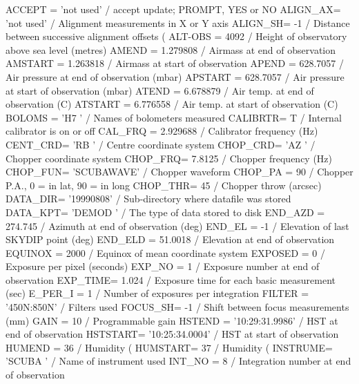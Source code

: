 \documentclass[twoside,11pt,nolof]{starlink}
\begin{document}
\begin{small}
\begin{terminalv}
ACCEPT  = 'not used'           / accept update; PROMPT, YES or NO
ALIGN_AX= 'not used'           / Alignment measurements in X or Y axis
ALIGN_SH=                   -1 / Distance between successive alignment offsets (
ALT-OBS =                 4092 / Height of observatory above sea level (metres)
AMEND   =             1.279808 / Airmass at end of observation
AMSTART =             1.263818 / Airmass at start of observation
APEND   =             628.7057 / Air pressure at end of observation (mbar)
APSTART =             628.7057 / Air pressure at start of observation (mbar)
ATEND   =             6.678879 / Air temp. at end of observation (C)
ATSTART =             6.776558 / Air temp. at start of observation (C)
BOLOMS  = 'H7      '           / Names of bolometers measured
CALIBRTR=                    T / Internal calibrator is on or off
CAL_FRQ =             2.929688 / Calibrator frequency (Hz)
CENT_CRD= 'RB      '           / Centre coordinate system
CHOP_CRD= 'AZ      '           / Chopper coordinate system
CHOP_FRQ=               7.8125 / Chopper frequency (Hz)
CHOP_FUN= 'SCUBAWAVE'          / Chopper waveform
CHOP_PA =                   90 / Chopper P.A., 0 = in lat, 90 = in long
CHOP_THR=                   45 / Chopper throw (arcsec)
DATA_DIR= '19990808'           / Sub-directory where datafile was stored
DATA_KPT= 'DEMOD   '           / The type of data stored to disk
END_AZD =              274.745 / Azimuth at end of observation (deg)
END_EL  =                   -1 / Elevation of last SKYDIP point (deg)
END_ELD =              51.0018 / Elevation at end of observation
EQUINOX =                 2000 / Equinox of mean coordinate system
EXPOSED =                    0 / Exposure per pixel (seconds)
EXP_NO  =                    1 / Exposure number at end of observation
EXP_TIME=                1.024 / Exposure time for each basic measurement (sec)
E_PER_I =                    1 / Number of exposures per integration
FILTER  = '450N:850N'          / Filters used
FOCUS_SH=                   -1 / Shift between focus measurements (mm)
GAIN    =                   10 / Programmable gain
HSTEND  = '10:29:31.9986'      / HST at end of observation
HSTSTART= '10:25:34.0004'      / HST at start of observation
HUMEND  =                   36 / Humidity (%
HUMSTART=                   37 / Humidity (%
INSTRUME= 'SCUBA   '           / Name of instrument used
INT_NO  =                    8 / Integration number at end of observation

\end{terminalv}
\end{small}
\end{document}
